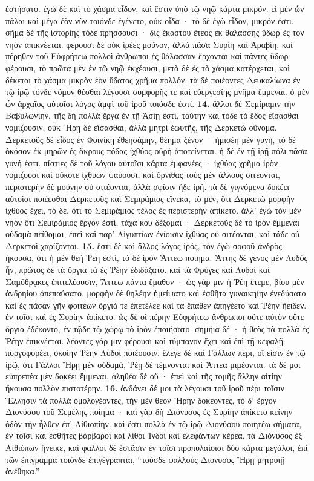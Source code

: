 \documentclass[a4paper, 11pt, oneside, polutonikogreek, german]{article}
\begin{document}
ἐστήσατο. ἐγὼ δὲ καὶ τὸ χάσμα εἶδον, καὶ ἔστιν ὑπὸ τῷ νηῷ κάρτα μικρόν. εἰ μὲν ὦν πάλαι καὶ μέγα ἐὸν νῦν τοιόνδε ἐγένετο, οὐκ οἶδα · τὸ δὲ ἐγὼ εἶδον, μικρόν ἐστι. σῆμα δὲ τῆς ἱστορίης τόδε πρήσσουσι · δὶς ἑκάστου ἔτεος ἐκ θαλάσσης ὕδωρ ἐς τὸν νηὸν ἀπικνέεται. φέρουσι δὲ οὐκ ἱρέες μοῦνον, ἀλλὰ πᾶσα Συρίη καὶ Ἀραβίη, καὶ πέρηθεν τοῦ Εὐφρήτεω πολλοὶ ἄνθρωποι ἐς θάλασσαν ἔρχονται καὶ πάντες ὕδωρ φέρουσι, τὸ πρῶτα μὲν ἐν τῷ νηῷ ἐκχέουσι, μετὰ δὲ ἐς τὸ χάσμα κατέρχεται, καὶ δέκεται τὸ χάσμα μικρὸν ἐὸν ὕδατος χρῆμα πολλόν. τὰ δὲ ποιέοντες Δευκαλίωνα ἐν τῷ ἱρῷ τόνδε νόμον θέσθαι λέγουσι συμφορῆς τε καὶ εὐεργεσίης μνῆμα ἔμμεναι. ὁ μὲν ὦν ἀρχαῖος αὐτοῖσι λόγος ἀμφὶ τοῦ ἱροῦ τοιόσδε ἐστί. \textbf{14.} ἄλλοι δὲ Σεμίραμιν τὴν Βαβυλωνίην, τῆς δὴ πολλὰ ἔργα ἐν τῇ Ἀσίῃ ἐστί, ταύτην καὶ τόδε τὸ ἕδος εἵσασθαι νομίζουσιν, οὐκ Ἥρῃ δὲ εἵσασθαι, ἀλλὰ μητρὶ ἑωυτῆς, τῆς Δερκετὼ οὔνομα. Δερκετοῦς δὲ εἶδος ἐν Φοινίκῃ ἐθεησάμην, θέημα ξένον · ἡμισέη μὲν γυνή, τὸ δὲ ὁκόσον ἐκ μηρῶν ἐς ἄκρους πόδας ἰχθύος οὐρὴ ἀποτείνεται. ἡ δὲ ἐν τῇ ἱρῇ πόλι πᾶσα γυνή ἐστι. πίστιες δὲ τοῦ λόγου αὐτοῖσι κάρτα ἐμφανέες · ἰχθύας χρῆμα ἱρὸν νομίζουσι καὶ οὔκοτε ἰχθύων ψαύουσι, καὶ ὄρνιθας τοὺς μὲν ἄλλους σιτέονται, περιστερὴν δὲ μούνην οὐ σιτέονται, ἀλλὰ σφίσιν ἥδε ἱρή. τὰ δὲ γιγνόμενα δοκέει αὐτοῖσι ποιέεσθαι Δερκετοῦς καὶ Σεμιράμιος εἵνεκα, τὸ μέν, ὅτι Δερκετὼ μορφὴν ἰχθύος ἔχει, τὸ δέ, ὅτι τὸ Σεμιράμιος τέλος ἐς περιστερὴν ἀπίκετο. ἀλλ' ἐγὼ τὸν μὲν νηὸν ὅτι Σεμιράμιος ἔργον ἐστί, τάχα κου δέξομαι · Δερκετοῦς δὲ τὸ ἱρὸν ἔμμεναι οὐδαμὰ πείθομαι, ἐπεὶ καὶ παρ' Αἰγυπτίων ἐνίοισιν ἰχθύας οὐ σιτέονται, καὶ τάδε οὐ Δερκετοῖ χαρίζονται. \textbf{15.} ἔστι δὲ καὶ ἄλλος λόγος ἱρός, τὸν ἐγὼ σοφοῦ ἀνδρὸς ἤκουσα, ὅτι ἡ μὲν θεὴ Ῥέη ἐστί, τὸ δὲ ἱρὸν Ἄττεω ποίημα. Ἄττης δὲ γένος μὲν Λυδὸς ἦν, πρῶτος δὲ τὰ ὄργια τὰ ἐς Ῥέην ἐδιδάξατο. καὶ τὰ Φρύγες καὶ Λυδοὶ καὶ Σαμόθρᾳκες ἐπιτελέουσιν, Ἄττεω πάντα ἔμαθον · ὡς γάρ μιν ἡ Ῥέη ἔτεμε, βίου μὲν ἀνδρηίου ἀπεπαύσατο, μορφὴν δὲ θηλέην ἠμείψατο καὶ ἐσθῆτα γυναικηίην ἐνεδύσατο καὶ ἐς πᾶσαν γῆν φοιτέων ὄργιά τε ἐπετέλεε καὶ τὰ ἔπαθεν ἀπηγέετο καὶ Ῥέην ἤειδεν. ἐν  τοῖσι καὶ ἐς Συρίην ἀπίκετο. ὡς δὲ οἱ πέρην Εὐφρήτεω ἄνθρωποι οὔτε αὐτὸν οὔτε ὄργια ἐδέκοντο, ἐν τῷδε τῷ χώρῳ τὸ ἱρὸν ἐποιήσατο. σημήια δέ · ἡ θεὸς τὰ πολλὰ ἐς Ῥέην ἐπικνέεται. λέοντες γάρ μιν φέρουσι καὶ τύμπανον ἔχει καὶ ἐπὶ τῇ κεφαλῇ πυργοφορέει, ὁκοίην Ῥέην Λυδοὶ ποιέουσιν. ἔλεγε δὲ καὶ Γάλλων πέρι, οἵ εἰσιν ἐν τῷ ἱρῷ, ὅτι Γάλλοι Ἥρῃ μὲν οὐδαμά, Ῥέῃ δὲ τέμνονται καὶ Ἄττεα μιμέονται. τὰ δέ μοι εὐπρεπέα μὲν δοκέει ἔμμεναι, ἀληθέα δὲ οὔ · ἐπεὶ καὶ τῆς τομῆς ἄλλην αἰτίην ἤκουσα πολλὸν πιστοτέρην. \textbf{16.} ἁνδάνει δέ μοι τὰ λέγουσι τοῦ ἱροῦ πέρι τοῖσιν Ἕλλησιν τὰ πολλὰ ὁμολογέοντες, τὴν μὲν θεὸν Ἥρην δοκέοντες, τὸ δ' ἔργον Διονύσου τοῦ Σεμέλης ποίημα · καὶ γὰρ δὴ Διόνυσος ἐς Συρίην ἀπίκετο κείνην ὁδὸν τὴν ἦλθεν ἐπ' Αἰθιοπίην. καὶ ἔστι πολλὰ ἐν τῷ ἱρῷ Διονύσου ποιητέω σήματα, ἐν τοῖσι καὶ ἐσθῆτες βάρβαροι καὶ λίθοι Ἰνδοὶ καὶ ἐλεφάντων κέρεα, τὰ Διόνυσος ἐξ Αἰθιόπων ἤνεικε, καὶ φαλλοὶ δὲ ἑστᾶσιν ἐν τοῖσι προπυλαίοισι δύο κάρτα μεγάλοι, ἐπὶ τῶν ἐπίγραμμα τοιόνδε ἐπιγέγραπται, "`τούσδε φαλλοὺς Διόνυσος Ἥρῃ μητρυιῇ ἀνέθηκα."'
\end{document}
